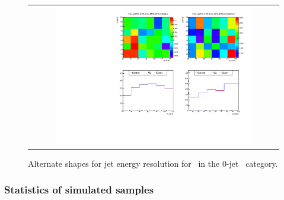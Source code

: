 %
\begin{figure}[htp]
\centering
\begin{tabular}{c}
\includegraphics[width=0.8\textwidth]{figures/histo_qqWW_CMS_hww_MVAJESBounding_0j_zoom.pdf}
\end{tabular}
\caption{Alternate shapes for jet energy resolution for \qqww\ in the 0-jet \DF\ category.}
\label{fig:alter_jes}
\end{figure}

\subsubsection{Statistics of simulated samples} 

